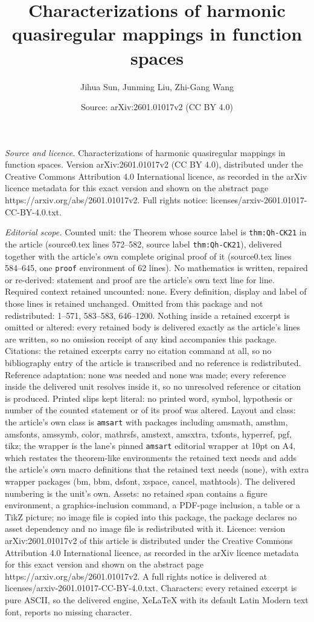 \documentclass[10pt,a4paper]{amsart}
\title[Characterizations of harmonic quasiregular mappings in funct]{Characterizations of harmonic quasiregular mappings in function spaces}
\author{Jihua Sun, Junming Liu, Zhi-Gang Wang}
\date{Source: arXiv:2601.01017v2 (CC BY 4.0)}
\begin{document}
\maketitle

\noindent\emph{Source and licence.} Characterizations of harmonic quasiregular mappings in function spaces. Version arXiv:2601.01017v2 (CC BY 4.0), distributed under the Creative Commons Attribution 4.0 International licence, as recorded in the arXiv licence metadata for this exact version and shown on the abstract page https://arxiv.org/abs/2601.01017v2. Full rights notice: licenses/arxiv-2601.01017-CC-BY-4.0.txt.\par\smallskip

\noindent\textit{Editorial scope.} Counted unit: the Theorem whose source label is \texttt{thm:Qh-CK21} in the article (source0.tex lines 572--582, source label \texttt{thm:Qh-CK21}), delivered together with the article's own complete original proof of it (source0.tex lines 584--645, one \texttt{proof} environment of 62 lines). No mathematics is written, repaired or re-derived: statement and proof are the article's own text line for line. Required context retained uncounted: none. Every definition, display and label of those lines is retained unchanged. Omitted from this package and not redistributed: 1--571, 583--583, 646--1200. Nothing inside a retained excerpt is omitted or altered: every retained body is delivered exactly as the article's lines are written, so no omission receipt of any kind accompanies this package. Citations: the retained excerpts carry no citation command at all, so no bibliography entry of the article is transcribed and no reference is redistributed. Reference adaptation: none was needed and none was made; every reference inside the delivered unit resolves inside it, so no unresolved reference or citation is produced. Printed slips kept literal: no printed word, symbol, hypothesis or number of the counted statement or of its proof was altered. Layout and class: the article's own class is \texttt{amsart} with packages including amsmath, amsthm, amsfonts, amssymb, color, mathrsfs, amstext, amsxtra, txfonts, hyperref, pgf, tikz; the wrapper is the lane's pinned \texttt{amsart} editorial wrapper at 10pt on A4, which restates the theorem-like environments the retained text needs and adds the article's own macro definitions that the retained text needs (none), with extra wrapper packages (bm, bbm, dsfont, xspace, cancel, mathtools). The delivered numbering is the unit's own. Assets: no retained span contains a figure environment, a graphics-inclusion command, a PDF-page inclusion, a table or a TikZ picture; no image file is copied into this package, the package declares no asset dependency and no image file is redistributed with it. Licence: version arXiv:2601.01017v2 of this article is distributed under the Creative Commons Attribution 4.0 International licence, as recorded in the arXiv licence metadata for this exact version and shown on the abstract page https://arxiv.org/abs/2601.01017v2. A full rights notice is delivered at licenses/arxiv-2601.01017-CC-BY-4.0.txt. Characters: every retained excerpt is pure ASCII, so the delivered engine, XeLaTeX with its default Latin Modern text font, reports no missing character.
\end{document}
